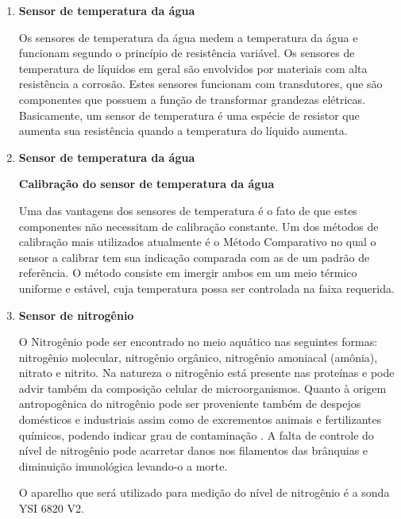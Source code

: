 \begin{enumerate}
    \item \textbf{Sensor de temperatura da água}
	
	Os sensores de temperatura da água medem a temperatura da água e funcionam segundo o princípio de resistência variável.
	Os sensores de temperatura de líquidos em geral são envolvidos por materiais com alta resistência a corrosão.
	Estes sensores funcionam com transdutores, que são componentes que possuem a função de transformar grandezas elétricas.
	Basicamente, um sensor de temperatura é uma espécie de resistor que aumenta sua resistência quando a temperatura do
	líquido aumenta.
	
    \item \textbf{Sensor de temperatura da água}
	
	\begin{center}
	 \textbf{Calibração do sensor de temperatura da água}
	\end{center}
	
	Uma das vantagens dos sensores de temperatura é o fato de que estes componentes não necessitam de calibração constante.
	Um dos métodos de calibração mais utilizados atualmente é o Método Comparativo no qual o sensor a calibrar tem sua
	indicação comparada com as de um padrão de referência. O método consiste em imergir ambos em um meio térmico uniforme
	e estável, cuja temperatura possa ser controlada na faixa requerida.
	
    \item \textbf{Sensor de nitrogênio}
	 
	O Nitrogênio pode ser encontrado no meio aquático nas seguintes formas: nitrogênio molecular, nitrogênio orgânico,
	nitrogênio amoniacal (amônia), nitrato e nitrito. Na natureza o nitrogênio está presente nas proteínas e pode advir
	também da composição celular de microorganismos. Quanto à origem antropogênica do nitrogênio pode ser proveniente 
	também de despejos domésticos e industriais assim como de excrementos animais e fertilizantes químicos, podendo indicar
	grau de contaminação \cite{sperling96}. A falta de controle do nível de nitrogênio pode acarretar danos nos 
	filamentos das brânquias e diminuição imunológica levando-o a morte.
	
	O aparelho que será utilizado para medição do nível de nitrogênio é a sonda YSI 6820 V2.
	
	\begin{table}[h]
	\centering
	\begin{tabular}{|c|c|p{6cm}|p{5cm}|}
	

\end{tabular}
\end{table}
\end{enumerate}

